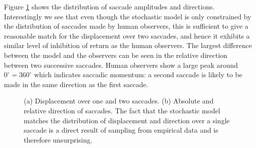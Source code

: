 \documentclass[man]{apa6}
\begin{document}
Figure \ref{fig:onetwostats} shows the distribution of saccade amplitudes and directions. Interestingly we see that even though the stochastic model is only constrained by the distribution of saccades made by human observers, this is sufficient to give a reasonable match for the displacement over two saccades, and hence it exhibits a similar level of inhibition of return as the human observers. The largest difference between the model and the observers can be seen in the relative direction between two successive saccades. Human observers show a large peak around $0^{\circ}=360^{\circ}$ which indicates saccadic momentum: a second saccade is likely to be made in the same direction as the first saccade. 



\begin{figure}
	\centering
	\caption{(a) Displacement over one and two saccades. (b) Absolute and relative direction of saccades. The fact that the stochastic model matches the distribution of displacement and direction over a single saccade is a direct result of sampling from empirical data and is therefore unsurprising.}
	\label{fig:onetwostats}
\end{figure}
\end{document}
